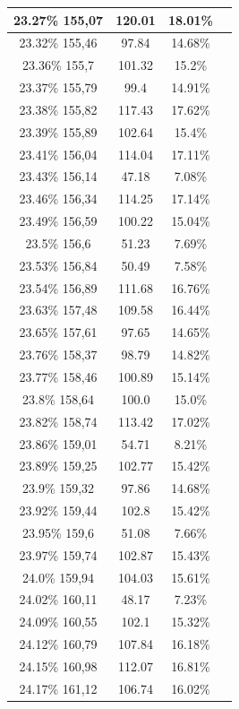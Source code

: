\begin{center}
\begin{longtable}{|c|c|c|c|}
23.27\% 155,07 & 120.01 & 18.01\%  \\ \hline
23.32\% 155,46 & 97.84 & 14.68\%  \\ \hline
23.36\% 155,7 & 101.32 & 15.2\%  \\ \hline
23.37\% 155,79 & 99.4 & 14.91\%  \\ \hline
23.38\% 155,82 & 117.43 & 17.62\%  \\ \hline
23.39\% 155,89 & 102.64 & 15.4\%  \\ \hline
23.41\% 156,04 & 114.04 & 17.11\%  \\ \hline
23.43\% 156,14 & 47.18 & 7.08\%  \\ \hline
23.46\% 156,34 & 114.25 & 17.14\%  \\ \hline
23.49\% 156,59 & 100.22 & 15.04\%  \\ \hline
23.5\% 156,6 & 51.23 & 7.69\%  \\ \hline
23.53\% 156,84 & 50.49 & 7.58\%  \\ \hline
23.54\% 156,89 & 111.68 & 16.76\%  \\ \hline
23.63\% 157,48 & 109.58 & 16.44\%  \\ \hline
23.65\% 157,61 & 97.65 & 14.65\%  \\ \hline
23.76\% 158,37 & 98.79 & 14.82\%  \\ \hline
23.77\% 158,46 & 100.89 & 15.14\%  \\ \hline
23.8\% 158,64 & 100.0 & 15.0\%  \\ \hline
23.82\% 158,74 & 113.42 & 17.02\%  \\ \hline
23.86\% 159,01 & 54.71 & 8.21\%  \\ \hline
23.89\% 159,25 & 102.77 & 15.42\%  \\ \hline
23.9\% 159,32 & 97.86 & 14.68\%  \\ \hline
23.92\% 159,44 & 102.8 & 15.42\%  \\ \hline
23.95\% 159,6 & 51.08 & 7.66\%  \\ \hline
23.97\% 159,74 & 102.87 & 15.43\%  \\ \hline
24.0\% 159,94 & 104.03 & 15.61\%  \\ \hline
24.02\% 160,11 & 48.17 & 7.23\%  \\ \hline
24.09\% 160,55 & 102.1 & 15.32\%  \\ \hline
24.12\% 160,79 & 107.84 & 16.18\%  \\ \hline
24.15\% 160,98 & 112.07 & 16.81\%  \\ \hline
24.17\% 161,12 & 106.74 & 16.02\%  \\ \hline

\end{longtable}
\end{center}
